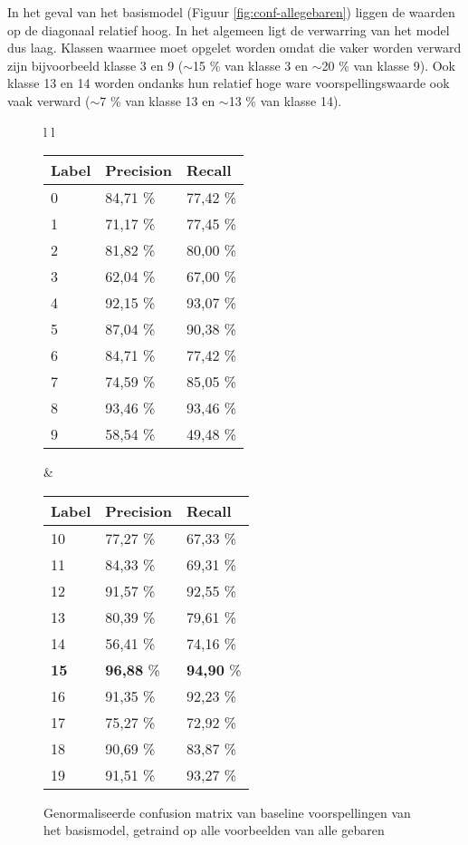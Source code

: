 \npar In het geval van het basismodel (Figuur \ref{fig:conf-allegebaren}) liggen de waarden op de diagonaal relatief hoog. In het algemeen ligt de verwarring van het model dus laag. Klassen waarmee moet opgelet worden omdat die vaker worden verward zijn bijvoorbeeld klasse 3 en 9 ($\sim$15 \% van klasse 3 en $\sim$20 \% van klasse 9). Ook klasse 13 en 14 worden ondanks hun relatief hoge ware voorspellingswaarde ook vaak verward ($\sim$7 \% van klasse 13 en $\sim$13 \% van klasse 14). 

\begin{figure}
	\centering
	\def\svgwidth{0.9\columnwidth}
	
	\caption{Genormaliseerde confusion matrix van baseline voorspellingen van het basismodel, getraind op alle voorbeelden van alle gebaren }
	\label{fig:conf-allegebaren}
	
	\vspace{1cm}
	\begin{tabular}{l l}
		\begin{tabular}{l l l}
			\hline
			\textbf{Label} & \textbf{Precision} &
			\textbf{Recall}\\
			\hline
			0 & 84,71 \% & 77,42 \% \\
			1 & 71,17 \% & 77,45 \% \\
			2 & 81,82 \% & 80,00 \% \\
			3 & 62,04 \% & 67,00 \% \\
			4 & 92,15 \% & 93,07 \% \\
			5 & 87,04 \% & 90,38 \% \\
			6 & 84,71 \% & 77,42 \% \\
			7 & 74,59 \% & 85,05 \% \\
			8 & 93,46 \% & 93,46 \% \\
			9 & 58,54 \% & 49,48 \% \\
			\hline
		\end{tabular} & 
		\begin{tabular}{l l l}
			\hline
			\textbf{Label} & \textbf{Precision} &
			\textbf{Recall}\\
			\hline
			10 & 77,27 \% & 67,33 \% \\
			11 & 84,33 \% & 69,31 \% \\
			12 & 91,57 \% & 92,55 \% \\
			13 & 80,39 \% & 79,61 \% \\
			14 & 56,41 \% & 74,16 \% \\
			\textbf{15} & \textbf{96,88} \% & \textbf{94,90} \% \\
			16 & 91,35 \% & 92,23 \% \\
			17 & 75,27 \% & 72,92 \% \\
			18 & 90,69 \% & 83,87 \% \\
			19 & 91,51 \% & 93,27 \% \\
			\hline
		\end{tabular}	
	\end{tabular}
	\label{tab:pr-alle-klassen}
\end{figure}

